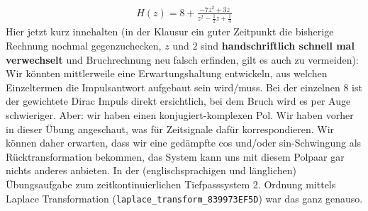 \begin{Loesung}
\begin{align}
H(z) = 8 + \frac{-7 z^2 + 3 z}{z^2-\frac{1}{2}z +\frac{1}{4}}
\end{align}
Hier jetzt kurz innehalten (in der Klausur ein guter Zeitpunkt die bisherige
Rechnung nochmal gegenzuchecken, $z$ und $2$ sind \textbf{handschriftlich schnell mal
verwechselt} und Bruchrechnung neu falsch erfinden, gilt es auch zu
vermeiden):
Wir könnten mittlerweile eine Erwartungshaltung entwickeln, aus welchen Einzeltermen
die Impulsantwort aufgebaut sein wird/muss. Bei der einzelnen 8 ist der gewichtete
Dirac Impuls direkt ersichtlich, bei dem Bruch wird es per Auge schwieriger.
Aber: wir haben einen konjugiert-komplexen Pol. Wir haben vorher in dieser Übung
angeschaut, was für Zeitsignale dafür korrespondieren.
Wir können daher erwarten, dass wir eine gedämpfte cos und/oder sin-Schwingung
als Rücktransformation bekommen, das System kann uns mit diesem Polpaar gar nichts
anderes anbieten. In der (englischsprachigen und länglichen) Übungsaufgabe
zum zeitkontinuierlichen Tiefpasssystem 2. Ordnung mittels Laplace Transformation
(\texttt{laplace\_transform\_839973EF5D})
war das ganz genauso.


\end{Loesung}
